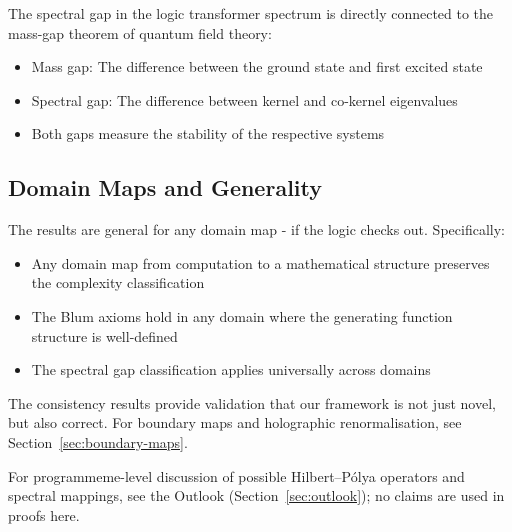 \begin{remark}
\label{rem:mass-gap}
The spectral gap in the logic transformer spectrum is directly connected to the mass-gap theorem of quantum field theory:
\begin{itemize}
\item Mass gap: The difference between the ground state and first excited state
\item Spectral gap: The difference between kernel and co-kernel eigenvalues
\item Both gaps measure the stability of the respective systems
\end{itemize}
\end{remark}

\subsection{Domain Maps and Generality}

\begin{theorem}
\label{thm:domain-generality}
The results are general for any domain map - if the logic checks out. Specifically:
\begin{itemize}
\item Any domain map from computation to a mathematical structure preserves the complexity classification
\item The Blum axioms hold in any domain where the generating function structure is well-defined
\item The spectral gap classification applies universally across domains
\end{itemize}
\end{theorem}

The consistency results provide validation that our framework is not just novel, but also correct. For boundary maps and holographic renormalisation, see Section~\ref{sec:boundary-maps}.

For programmeme-level discussion of possible Hilbert--P\'olya operators and spectral mappings, see the Outlook (Section~\ref{sec:outlook}); no claims are used in proofs here.
